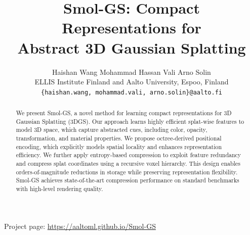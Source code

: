 \documentclass{article}
\title{Smol-GS: Compact Representations for \\ Abstract 3D Gaussian Splatting}
\author{%
  Haishan Wang \quad Mohammad Hassan Vali \quad Arno Solin \\
  ELLIS Institute Finland and Aalto University, Espoo, Finland \\
  \texttt{\{haishan.wang, mohammad.vali, arno.solin\}@aalto.fi}
}
\newcommand{\ours}{Smol-GS\xspace}
\begin{document}
\maketitle
\begin{abstract}
We present \ours, a novel method for learning compact representations for 3D Gaussian Splatting (3DGS). Our approach learns highly efficient splat-wise features to model 3D space, which capture abstracted cues, including color, opacity, transformation, and material properties. We propose octree-derived positional encoding, which explicitly models spatial locality and enhances representation efficiency. We further apply entropy-based compression to exploit feature redundancy and compress splat coordinates using a recursive voxel hierarchy. This design enables orders-of-magnitude reductions in storage while preserving representation flexibility. \ours achieves state-of-the-art compression performance on standard benchmarks with high-level rendering quality.
\sloppy
\end{abstract}
\noindent
Project page: {\small\url{https://aaltoml.github.io/Smol-GS}}
\end{document}
